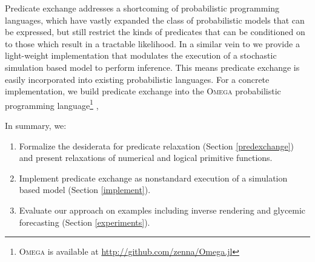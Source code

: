 


Predicate exchange addresses a shortcoming of probabilistic programming languages,
which have vastly expanded the class of probabilistic models that can be expressed, but still restrict the kinds of predicates that can be conditioned on to those which result in a tractable likelihood.
In a similar vein to  \cite{wingate2011lightweight} we provide a light-weight implementation that modulates the execution of a stochastic simulation based model to perform inference.
This means predicate exchange is easily incorporated into existing probabilistic languages.
For a concrete implementation, we build predicate exchange into the \textsc{Omega} probabilistic programming language\footnote{\textsc{Omega} is available at \url{http://github.com/zenna/Omega.jl}} \cite{rcd},


In summary, we:

\begin{enumerate}
	\item Formalize the desiderata for predicate relaxation (Section \ref{predexchange}) and present relaxations of numerical and logical primitive functions.
	\item Implement predicate exchange as nonstandard execution of a simulation based model (Section \ref{implement}).
	\item Evaluate our approach on examples including inverse rendering and glycemic forecasting (Section \ref{experiments}).
\end{enumerate}


